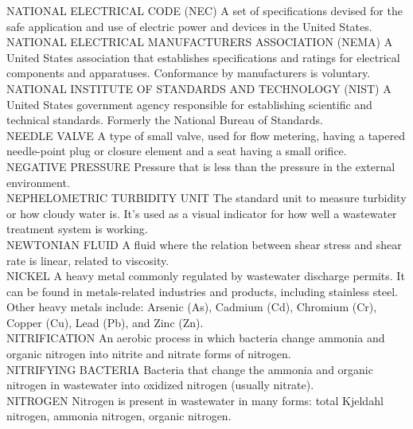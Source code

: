 NATIONAL ELECTRICAL CODE (NEC)
A set of specifications devised for the safe application and use of electric power and devices in the United States.
\vspace{0.3cm}\\
NATIONAL ELECTRICAL MANUFACTURERS ASSOCIATION (NEMA)
A United States association that establishes specifications and ratings for electrical components and apparatuses. Conformance by manufacturers is voluntary.
\vspace{0.3cm}\\
NATIONAL INSTITUTE OF STANDARDS AND TECHNOLOGY (NIST)
A United States government agency responsible for establishing scientific and technical standards. Formerly the National Bureau of Standards.
\vspace{0.3cm}\\
NEEDLE VALVE
A type of small valve, used for flow metering, having a tapered needle-point plug or closure element and a seat having a small orifice.
\vspace{0.3cm}\\
NEGATIVE PRESSURE
Pressure that is less than the pressure in the external environment.
\vspace{0.3cm}\\
NEPHELOMETRIC TURBIDITY UNIT
The standard unit to measure turbidity or how cloudy water is. It’s used as a visual indicator for how well a wastewater treatment system is working.
\vspace{0.3cm}\\
NEWTONIAN FLUID
A fluid where the relation between shear stress and shear rate is linear, related to viscosity.
\vspace{0.3cm}\\
NICKEL
A heavy metal commonly regulated by wastewater discharge permits. It can be found in metals-related industries and products, including stainless steel. Other heavy metals include: Arsenic (As), Cadmium (Cd), Chromium (Cr), Copper (Cu), Lead (Pb), and Zinc (Zn).
\vspace{0.3cm}\\
NITRIFICATION
An aerobic process in which bacteria change ammonia and organic nitrogen into nitrite and nitrate forms of nitrogen.
\vspace{0.3cm}\\
NITRIFYING BACTERIA
Bacteria that change the ammonia and organic nitrogen in wastewater into oxidized nitrogen (usually nitrate).
\vspace{0.3cm}\\
NITROGEN
Nitrogen is present in wastewater in many forms: total Kjeldahl nitrogen, ammonia nitrogen, organic nitrogen.

